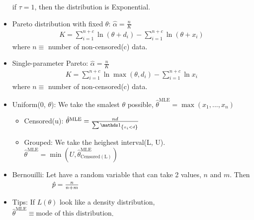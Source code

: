 \documentclass[10pt, french]{article}
\begin{document}
\begin{multicols*}{3}
\begin{itemize}[align=left,leftmargin=*]
    if $\tau=1$, then the distribution is Exponential.
    \item Pareto distribution with fixed $\theta$: $\hat{\alpha} = \frac{n}{K}$
    \begin{align*}
      K = \sum_{i=1}^{n+c} \ln(\theta+d_i) - \sum_{i=1}^{n+c} \ln(\theta+x_i)
    \end{align*}
    where $n\equiv$ number of non-censored(c) data.
    \item Single-parameter Pareto: $\hat{\alpha} = \frac{n}{K}$
    \begin{align*}
      K = \sum_{i=1}^{n+c} \ln \max(\theta, d_i) - \sum_{i=1}^{n+c} \ln x_i
    \end{align*}
    where $n\equiv$ number of non-censored(c) data.
    \item Uniform(0, $\theta$): We take the smalest $\theta$ possible, $\hat{\theta}^{\mathrm{MLE}} = \max(x_1,...,x_n)$
    \begin{itemize}
        \item Censored(u): $\hat{\theta}^{\mathrm{MLE}} = \frac{n d}{\sum \indic{x_i < d }}$
        \item Grouped: We take the heighest interval(L, U). $\hat{\theta}^{\mathrm{MLE}} = \min(U, \hat{\theta}^{\mathrm{MLE}}_{\mathrm{Censored(L)}}) $
    \end{itemize}
    \item Bernouilli: Let have a random variable that can take 2 values, $n$ and $m$. Then \\
    $\hspace*{2cm} \hat{p} = \frac{n}{n+m}$
    \item Tips: If $L(\theta)$ look like a density distribution, $\hat{\theta}^{\mathrm{MLE}}\equiv\text{mode of this distribution}$.
\end{itemize}


\end{multicols*}
\end{document}
